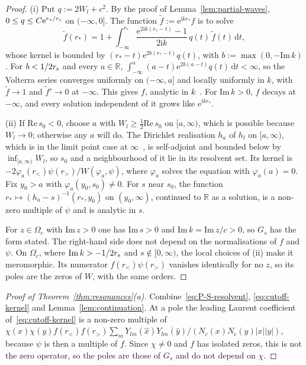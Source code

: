 \documentclass[%
 aip,
 jmp,
 amsmath,amssymb,
 reprint, onecolumn
]{revtex4-1}
\theoremstyle{definition}
\theoremstyle{remark}
\newcommand{\R}{\mathbb{R}}
\newcommand{\rmd}{\mathrm{d}}
\newcommand{\rmi}{\mathrm{i}}
\newcommand{\rme}{\mathrm{e}}
\begin{document}
\begin{proof}
(i) Put $q:=2W_l+c^2$. By the proof of Lemma~\ref{lem:partial-waves},
$0\leq q\leq C\rme^{r_*/r_{\rm s}}$ on $(-\infty,0]$. The function
$\tilde f:=\rme^{\rmi kr_*}f$ is to solve
\[
\tilde f(r_*)=1+\int_{-\infty}^{r_*}\frac{\rme^{2\rmi k(r_*-t)}-1}{2\rmi k}\,
q(t)\,\tilde f(t)\,\rmd t,
\]
whose kernel is bounded by $(r_*-t)\rme^{2b(r_*-t)}q(t)$, with
$b:=\max(0,-\mathrm{Im}\,k)$. For $b<1/2r_{\rm s}$ and every $a\in\R$,
$\int_{-\infty}^a(a-t)\rme^{2b(a-t)}q(t)\,\rmd t<\infty$, so the Volterra
series converges uniformly on $(-\infty,a]$ and locally uniformly in $k$,
with $\tilde f\to1$ and $\tilde f'\to0$ at $-\infty$. This gives $f$, analytic in $k$~\cite{Weidmann1987}.
For $\mathrm{Im}\,k>0$, $f$ decays at $-\infty$, and every solution
independent of it grows like $\rme^{\rmi kr_*}$.

(ii) If $\mathrm{Re}\,s_0<0$, choose $a$ with $W_l\geq\frac12\mathrm{Re}\,
s_0$ on $[a,\infty)$, which is possible because $W_l\to0$; otherwise any
$a$ will do. The Dirichlet realisation $h_a$ of $h_l$ on $[a,\infty)$, which is in
the limit point case at $\infty$~\cite{Weidmann1987}, is self-adjoint
and bounded below by $\inf_{[a,\infty)}W_l$, so $s_0$ and a
neighbourhood of it lie in its resolvent set. Its kernel is
$-2\varphi_a(r_<)\psi(r_>)/W(\varphi_a,\psi)$, where $\varphi_a$ solves
the equation with $\varphi_a(a)=0$. Fix $y_0>a$ with
$\varphi_a(y_0,s_0)\neq0$. For $s$ near $s_0$, the function $r_*\mapsto
(h_a-s)^{-1}(r_*,y_0)$ on $(y_0,\infty)$, continued to $\R$ as a solution,
is a non-zero multiple of $\psi$ and is analytic in $s$.

For $z\in\Omega_c$ with $\mathrm{Im}\,z>0$ one has $\mathrm{Im}\,s>0$ and $\mathrm{Im}\,k=
\mathrm{Im}\,z/c>0$, so $G_s$ has the form stated. The right-hand side
does not depend on the normalisations of $f$ and $\psi$. On $\Omega_c$,
where $\mathrm{Im}\,k>-1/2r_{\rm s}$ and $s\notin[0,\infty)$, the local
choices of (ii) make it meromorphic. Its numerator $f(r_<)\psi(r_>)$
vanishes identically for no $z$, so its poles are the zeros of $W$, with
the same orders.
\end{proof}

\begin{proof}[Proof of Theorem~\ref{thm:resonances}(a)]
Combine~\eqref{eq:P-S-resolvent}, \eqref{eq:cutoff-kernel} and
Lemma~\ref{lem:continuation}. At a pole the leading Laurent coefficient
of~\eqref{eq:cutoff-kernel} is a non-zero multiple of
$\chi(x)\chi(y)f(r_<)f(r_>)\sum_mY_{lm}(\hat x)\overline{Y_{lm}(\hat y)}
/(N_c(x)N_c(y)|x||y|)$, because $\psi$ is then a multiple of $f$. Since
$\chi\neq0$ and $f$ has isolated zeros, this is not the zero operator, so
the poles are those of $G_s$ and do not depend on $\chi$.
\end{proof}
\end{document}
